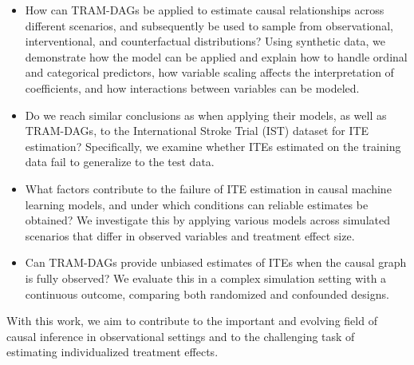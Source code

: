 \begin{itemize}
    \item How can TRAM-DAGs be applied to estimate causal relationships across different scenarios, and subsequently be used to sample from observational, interventional, and counterfactual distributions? Using synthetic data, we demonstrate how the model can be applied and explain how to handle ordinal and categorical predictors, how variable scaling affects the interpretation of coefficients, and how interactions between variables can be modeled.

    
    \item Do we reach similar conclusions as \citet{chen2025} when applying their models, as well as TRAM-DAGs, to the International Stroke Trial (IST) dataset for ITE estimation? Specifically, we examine whether ITEs estimated on the training data fail to generalize to the test data.

    \item What factors contribute to the failure of ITE estimation in causal machine learning models, and under which conditions can reliable estimates be obtained? We investigate this by applying various models across simulated scenarios that differ in observed variables and treatment effect size.

    \item Can TRAM-DAGs provide unbiased estimates of ITEs when the causal graph is fully observed? We evaluate this in a complex simulation setting with a continuous outcome, comparing both randomized and confounded designs.
\end{itemize}




% 



With this work, we aim to contribute to the important and evolving field of causal inference in observational settings and to the challenging task of estimating individualized treatment effects.
